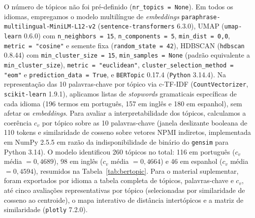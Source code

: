 O número de tópicos não foi pré-definido (\texttt{nr\_topics = None}). Em todos os idiomas, empregamos o modelo multilíngue de \textit{embeddings} \texttt{paraphrase-multilingual-MiniLM-L12-v2} (\texttt{sentence-transformers} 6.3.0), UMAP (\texttt{umap-learn} 0.6.0) com \texttt{n\_neighbors = 15}, \texttt{n\_components = 5}, \texttt{min\_dist = 0{,}0}, \texttt{metric = "cosine"} e semente fixa (\texttt{random\_state = 42}), HDBSCAN (\texttt{hdbscan} 0.8.44) com \texttt{min\_cluster\_size = 15}, \texttt{min\_samples = None} (padrão equivalente a \texttt{min\_cluster\_size}), \texttt{metric = "euclidean"}, \texttt{cluster\_selection\_method = "eom"} e \texttt{prediction\_data = True}, e \texttt{BERTopic} 0.17.4 (\texttt{Python} 3.14.4). Na representação das 10 palavras-chave por tópico via c-TF-IDF (\texttt{CountVectorizer}, \texttt{scikit-learn} 1.9.1), aplicamos listas de \textit{stopwords} gramaticais específicas de cada idioma (196 termos em português, 157 em inglês e 180 em espanhol), sem afetar os \textit{embeddings}. Para avaliar a interpretabilidade dos tópicos, calculamos a coerência $c_v$ \parencite{roder2015} por tópico sobre as 10 palavras-chave (janela deslizante booleana de 110 tokens e similaridade de cosseno sobre vetores NPMI indiretos, implementada em NumPy 2.5.5 em razão da indisponibilidade de binário do \texttt{gensim} para Python 3.14). O modelo identificou 260 tópicos no total: 116 em português ($c_v$ média $= 0{,}4689$), 98 em inglês ($c_v$ média $= 0{,}4664$) e 46 em espanhol ($c_v$ média $= 0{,}4594$), resumidos na Tabela~\ref{tab:bertopic}. Para o material suplementar, foram exportados por idioma a tabela completa de tópicos, palavras-chave e $c_v$, até cinco avaliações representativas por tópico (selecionadas por similaridade de cosseno ao centroide), o mapa interativo de distância intertópicos e a matriz de similaridade (\texttt{plotly} 7.2.0).

